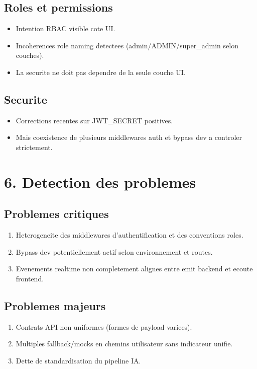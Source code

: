 \documentclass[12pt,a4paper]{article}
\begin{document}
\subsection{Roles et permissions}
\begin{itemize}
  \item Intention RBAC visible cote UI.
  \item Incoherences role naming detectees (admin/ADMIN/super\_admin selon couches).
  \item La securite ne doit pas dependre de la seule couche UI.
\end{itemize}

\subsection{Securite}
\begin{itemize}
  \item Corrections recentes sur JWT\_SECRET positives.
  \item Mais coexistence de plusieurs middlewares auth et bypass dev a controler strictement.
\end{itemize}

\section{6. Detection des problemes}
\subsection{Problemes critiques}
\begin{enumerate}
  \item Heterogeneite des middlewares d'authentification et des conventions roles.
  \item Bypass dev potentiellement actif selon environnement et routes.
  \item Evenements realtime non completement alignes entre emit backend et ecoute frontend.
\end{enumerate}

\subsection{Problemes majeurs}
\begin{enumerate}
  \item Contrats API non uniformes (formes de payload variees).
  \item Multiples fallback/mocks en chemins utilisateur sans indicateur unifie.
  \item Dette de standardisation du pipeline IA.
\end{enumerate}
\end{document}
